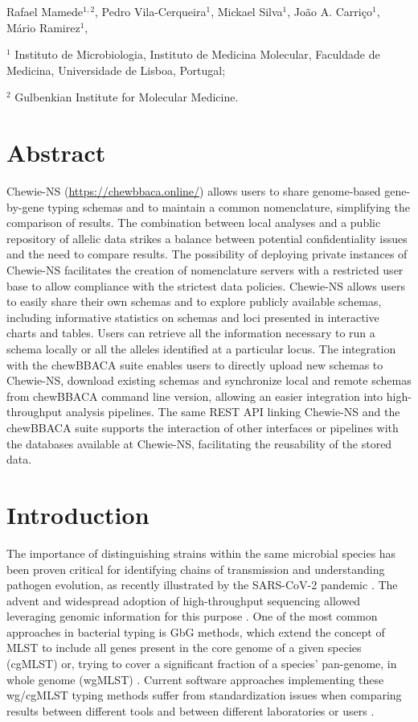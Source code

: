 Rafael Mamede$^{1,2}$, 
Pedro Vila-Cerqueira$^1$, 
Mickael Silva$^1$,
João A. Carriço$^1$,
Mário Ramirez$^1$,

$^1$ Instituto de Microbiologia, Instituto de Medicina Molecular, Faculdade de Medicina, Universidade de Lisboa, Portugal;

$^2$ Gulbenkian Institute for Molecular Medicine.

\section{Abstract} \label{sec:ch3_abstract}

\ac{Chewie-NS} (\url{https://chewbbaca.online/}) allows users to share genome-based gene-by-gene typing schemas and to maintain a common nomenclature, simplifying the comparison of results. The combination between local analyses and a public repository of allelic data strikes a balance between potential confidentiality issues and the need to compare results. The possibility of deploying private instances of \ac{Chewie-NS} facilitates the creation of nomenclature servers with a restricted user base to allow compliance with the strictest data policies. \ac{Chewie-NS} allows users to easily share their own schemas and to explore publicly available schemas, including informative statistics on schemas and loci presented in interactive charts and tables. Users can retrieve all the information necessary to run a schema locally or all the alleles identified at a particular locus. The integration with the chewBBACA suite enables users to directly upload new schemas to \ac{Chewie-NS}, download existing schemas and synchronize local and remote schemas from chewBBACA command line version, allowing an easier integration into high-throughput analysis pipelines. The same \ac{REST} \ac{API} linking \ac{Chewie-NS} and the chewBBACA suite supports the interaction of other interfaces or pipelines with the databases available at \ac{Chewie-NS}, facilitating the reusability of the stored data.

\section{Introduction} \label{sec:ch3_introduction}

The importance of distinguishing strains within the same microbial species has been proven critical for identifying chains of transmission and understanding pathogen evolution, as recently illustrated by the SARS-CoV-2 pandemic \cite{black_ten_2020, deng_genomic_2020}. The advent and widespread adoption of high-throughput sequencing allowed leveraging genomic information for this purpose \cite{black_ten_2020, deng_genomic_2020}. One of the most common approaches in bacterial typing is \ac{GbG} methods, which extend the concept of \ac{MLST} to include all genes present in the core genome of a given species (\ac{cgMLST}) or, trying to cover a significant fraction of a species’ pan-genome, in whole genome (\ac{wgMLST}) \cite{maiden_mlst_2013}. Current software approaches implementing these \ac{wg/cgMLST} typing methods suffer from standardization issues when comparing results between different tools and between different laboratories or users \cite{uelze_typing_2020}.

